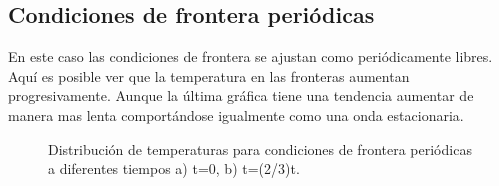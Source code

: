 \documentclass{report}
\begin{document}
\subsection*{Condiciones de frontera periódicas}
En este caso las condiciones de frontera se ajustan como periódicamente libres. Aquí es posible ver que la temperatura en las fronteras aumentan progresivamente. Aunque la última gráfica tiene una tendencia aumentar de manera mas lenta comportándose igualmente como una onda estacionaria.
\begin{figure}[H]
    \centering
        \caption{Distribución de temperaturas para condiciones de frontera periódicas a diferentes tiempos a) t=0, b) t=(2/3)t.}
    \label{fig:Condicionesabieertas}
\end{figure}
\end{document}
